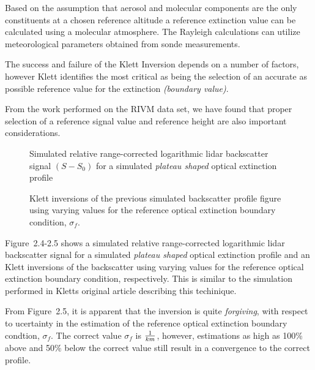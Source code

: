 Based on the assumption that aerosol and molecular components are the 
only constituents at a chosen reference altitude a reference extinction
value can be calculated using a molecular atmosphere.
The Rayleigh calculations can utilize meteorological parameters 
obtained from sonde measurements.


The success and failure of the Klett Inversion depends on a number of
factors, however Klett \cite{jdk1} identifies the most 
critical as being the selection of
an accurate as possible reference value for the extinction {\em (boundary
value)}. 

From the work performed on the RIVM data set,
we have found that proper selection of a reference signal value and
reference height are also important considerations.

\begin{figure}
\vspace{5.0in}
\caption{Simulated relative range-corrected logarithmic 
lidar backscatter signal $(S-S_{0})$
for a simulated {\em plateau shaped} optical extinction profile}
\end{figure}

\begin{figure}
\vspace{5.0in}
\caption{Klett inversions of the previous simulated 
backscatter profile figure using varying values
for the reference optical extinction boundary condition,
$\sigma_{f}$.}
\end{figure}

Figure~{2.4-2.5} shows a simulated relative range-corrected logarithmic 
lidar backscatter signal for a 
simulated {\em plateau shaped} optical extinction profile and
an Klett inversions of the backscatter using varying values
for the reference optical extinction boundary condition,
respectively. This is similar to the simulation performed
in Kletts original article describing this techinique\cite{jdk1}.

From Figure~{2.5}, it is apparent that the inversion is quite
{\em forgiving}, with respect to ucertainty in the estimation
of the reference optical extinction boundary condtion, 
$\sigma_{f}$. The correct value $\sigma_{f}$ is $1\over{km}$,
however, estimations as high as 100\% above and 50\% below
the correct value still result in a convergence to the correct
profile.


